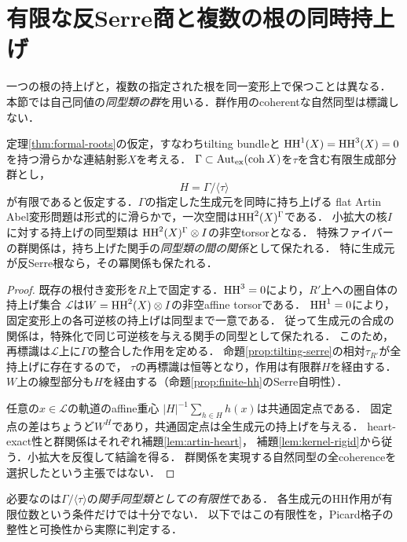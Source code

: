 \section{有限な反Serre商と複数の根の同時持上げ}
\label{sec:simultaneous}
一つの根の持上げと，複数の指定された根を同一変形上で保つことは異なる．
本節では自己同値の\emph{同型類の群}を用いる．群作用のcoherentな自然同型は標識しない．

\begin{theorem}[有限反Serre商による同時持上げ]\label{thm:finite-package}
定理\ref{thm:formal-roots}の仮定，すなわちtilting bundleと
$\operatorname{HH}^1(X)=\operatorname{HH}^3(X)=0$を持つ滑らかな連結射影$X$を考える．
$\Gamma\subset\operatorname{Aut}_{\mathrm{ex}}(\operatorname{coh} X)$を$\tau$を含む有限生成部分群とし，
\[
 H=\Gamma/\langle\tau\rangle
\]
が有限であると仮定する．$\Gamma$の指定した生成元を同時に持ち上げる
flat Artin Abel変形問題は形式的に滑らかで，一次空間は$\operatorname{HH}^2(X)^\Gamma$である．
小拡大の核$I$に対する持上げの同型類は
$\operatorname{HH}^2(X)^\Gamma\otimes I$の非空torsorとなる．
特殊ファイバーの群関係は，持ち上げた関手の\emph{同型類の間の関係}として保たれる．
特に生成元が反Serre根なら，その冪関係も保たれる．
\end{theorem}
\begin{proof}
既存の根付き変形を$R$上で固定する．$\operatorname{HH}^3=0$により，$R'$上への圏自体の持上げ集合
$\mathcal L$は$W=\operatorname{HH}^2(X)\otimes I$の非空affine torsorである．
$\operatorname{HH}^1=0$により，固定変形上の各可逆核の持上げは同型まで一意である．
従って生成元の合成の関係は，特殊化で同じ可逆核を与える関手の同型として保たれる．
このため，再標識は$\mathcal L$上に$\Gamma$の整合した作用を定める．
命題\ref{prop:tilting-serre}の相対$\tau_{R'}$が全持上げに存在するので，
$\tau$の再標識は恒等となり，作用は有限群$H$を経由する．
$W$上の線型部分も$H$を経由する（命題\ref{prop:finite-hh}のSerre自明性）．

任意の$x\in\mathcal L$の軌道のaffine重心
$|H|^{-1}\sum_{h\in H}h(x)$は共通固定点である．
固定点の差はちょうど$W^H$であり，共通固定点は全生成元の持上げを与える．
heart-exact性と群関係はそれぞれ補題\ref{lem:artin-heart}，
補題\ref{lem:kernel-rigid}から従う．小拡大を反復して結論を得る．
群関係を実現する自然同型の全coherenceを選択したという主張ではない．
\end{proof}

\begin{remark}[有限性の位置]
必要なのは$\Gamma/\langle\tau\rangle$の\emph{関手同型類としての有限性}である．
各生成元のHH作用が有限位数という条件だけでは十分でない．
以下ではこの有限性を，Picard格子の整性と可換性から実際に判定する．
\end{remark}

